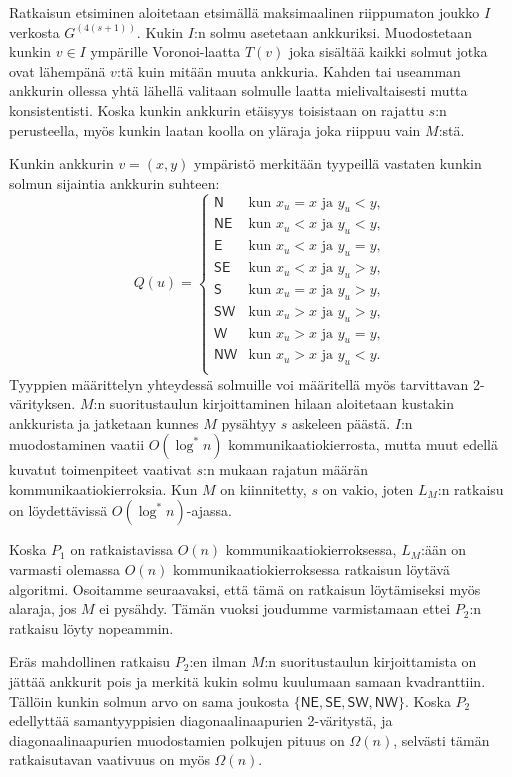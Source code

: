 \documentclass[12pt,finnish]{tktltiki2}
\theoremstyle{definition}
\theoremstyle{remark}
\begin{document}
Ratkaisun etsiminen aloitetaan etsimällä maksimaalinen riippumaton joukko $I$ verkosta $G^{(4(s+1))}$. Kukin $I$:n solmu asetetaan ankkuriksi. Muodostetaan kunkin $v \in I$ ympärille Voronoi-laatta $T(v)$ joka sisältää kaikki solmut jotka ovat lähempänä $v$:tä kuin mitään muuta ankkuria. Kahden tai useamman ankkurin ollessa yhtä lähellä valitaan solmulle laatta mielivaltaisesti mutta konsistentisti. Koska kunkin ankkurin etäisyys toisistaan on rajattu $s$:n perusteella, myös kunkin laatan koolla on yläraja joka riippuu vain $M$:stä.

Kunkin ankkurin $v = (x, y)$ ympäristö merkitään tyypeillä vastaten kunkin solmun sijaintia ankkurin suhteen:
\[
 Q(u) = 
  \begin{cases} 
   \mathsf{N} & \text{kun } x_u = x \text{ ja } y_u < y, \\
   \mathsf{NE} & \text{kun } x_u < x \text{ ja } y_u < y, \\
   \mathsf{E} & \text{kun } x_u < x \text{ ja } y_u = y, \\
   \mathsf{SE} & \text{kun } x_u < x \text{ ja } y_u > y, \\
   \mathsf{S} & \text{kun } x_u = x \text{ ja } y_u > y, \\
   \mathsf{SW} & \text{kun } x_u > x \text{ ja } y_u > y, \\
   \mathsf{W} & \text{kun } x_u > x \text{ ja } y_u = y, \\
   \mathsf{NW} & \text{kun } x_u > x \text{ ja } y_u < y. \\
  \end{cases}
\]
Tyyppien määrittelyn yhteydessä solmuille voi määritellä myös tarvittavan 2-värityksen. $M$:n suoritustaulun kirjoittaminen hilaan aloitetaan kustakin ankkurista ja jatketaan kunnes $M$ pysähtyy $s$ askeleen päästä. $I$:n muodostaminen vaatii $O(\log^* n)$ kommunikaatiokierrosta, mutta muut edellä kuvatut toimenpiteet vaativat $s$:n mukaan rajatun määrän kommunikaatiokierroksia. Kun $M$ on kiinnitetty, $s$ on vakio, joten $L_M$:n ratkaisu on löydettävissä $O(\log^* n)$-ajassa.

Koska $P_1$ on ratkaistavissa $O(n)$ kommunikaatiokierroksessa, $L_M$:ään on varmasti olemassa $O(n)$ kommunikaatiokierroksessa ratkaisun löytävä algoritmi. Osoitamme seuraavaksi, että tämä on ratkaisun löytämiseksi myös alaraja, jos $M$ ei pysähdy. Tämän vuoksi joudumme varmistamaan ettei $P_2$:n ratkaisu löyty nopeammin.

Eräs mahdollinen ratkaisu $P_2$:en ilman $M$:n suoritustaulun kirjoittamista on jättää ankkurit pois ja merkitä kukin solmu kuulumaan samaan kvadranttiin. Tällöin kunkin solmun arvo on sama joukosta $\{\mathsf{NE}, \mathsf{SE},\mathsf{SW},\mathsf{NW}\}$. Koska $P_2$ edellyttää samantyyppisien diagonaalinaapurien 2-väritystä, ja diagonaalinaapurien muodostamien polkujen pituus on $\Omega(n)$, selvästi tämän ratkaisutavan vaativuus on myös $\Omega(n)$.
\end{document}
